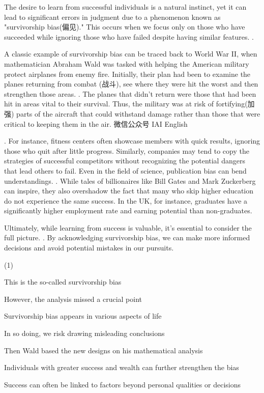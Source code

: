 \documentclass{英语试卷}
\begin{document}
\par The desire to learn from successful individuals is a natural instinct, yet it can lead to significant errors in judgment due to a phenomenon known as "survivorship bias(偏见)." This occurs when we focus only on those who have succeeded while ignoring those who have failed despite having similar features. .\par
\par A classic example of survivorship bias can be traced back to World War II, when mathematician Abraham Wald was tasked with helping the American military protect airplanes from enemy fire. Initially, their plan had been to examine the planes returning from combat (战斗), see where they were hit the worst and then strengthen those areas. . The planes that didn't return were those that had been hit in areas vital to their survival. Thus, the military was at risk of fortifying(加强) parts of the aircraft that could withstand damage rather than those that were critical to keeping them in the air. 微信公众号 IAI English\par
\par {}. For instance, fitness centers often showcase members with quick results, ignoring those who quit after little progress. Similarly, companies may tend to copy the strategies of successful competitors without recognizing the potential dangers that lead others to fail. Even in the field of science, publication bias can bend understandings. . While tales of billionaires like Bill Gates and Mark Zuckerberg can inspire, they also overshadow the fact that many who skip higher education do not experience the same success. In the UK, for instance, graduates have a significantly higher employment rate and earning potential than non-graduates.\par
\par Ultimately, while learning from success is valuable, it's essential to consider the full picture. . By acknowledging survivorship bias, we can make more informed decisions and avoid potential mistakes in our pursuits.\par
\begin{choices}(1)
  \item This is the so-called survivorship bias
  \item However, the analysis missed a crucial point
  \item Survivorship bias appears in various aspects of life
  \item In so doing, we risk drawing misleading conclusions
  \item Then Wald based the new designs on his mathematical analysis
  \item Individuals with greater success and wealth can further strengthen the bias
  \item Success can often be linked to factors beyond personal qualities or decisions
\end{choices}
\end{document}
